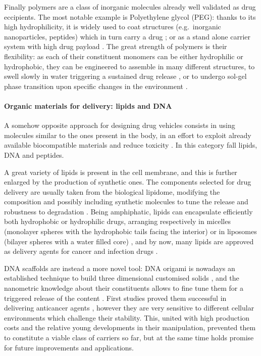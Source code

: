 Finally polymers are a class of inorganic molecules already well validated as drug eccipients. The most notable example is Polyethylene glycol (PEG): thanks to its high hydrophilicity, it is widely used to coat structures (e.g.\ inorganic nanoparticles, peptides) which in turn carry a drug \cite{Lammers2009}; or as a stand alone carrier system with high drug payload \cite{Liechty2010}. The great strength of polymers is their flexibility: as each of their constituent monomers can be either hydrophilic or hydrophobic, they can be engineered to assemble in many different structures, to swell slowly in water triggering a sustained drug release \cite{Nicolas2013}, or to undergo sol-gel phase transition upon specific changes in the environment \cite{Liechty2010}.


\paragraph{Organic materials for delivery: lipids and DNA} \label{sec:organic}

A somehow opposite approach for designing drug vehicles consists in using molecules similar to the ones present in the body, in an effort to exploit already available biocompatible materials and reduce toxicity \cite{Yoo2011}. In this category fall lipids, DNA and peptides.

A great variety of lipids is present in the cell membrane, and this is further enlarged by the production of synthetic ones. The components selected for drug delivery are usually taken from the biological lipidome, modifying the composition and possibly including synthetic molecules to tune the release and robustness to degradation \cite{Yingchoncharoen2016}.
%
Being amphiphatic, lipids can encapsulate efficiently both hydrophobic or hydrophilic drugs, arranging respectively in micelles (monolayer spheres with the hydrophobic tails facing the interior) or in liposomes (bilayer spheres with a water filled core) \cite{Bunker2016}, and by now, many lipids are approved as delivery agents for cancer and infection drugs \cite{Pattni2015paper, Jain2017}.

DNA scaffolds are instead a more novel tool: DNA origami is nowadays an established technique to build three dimensional customised solids \cite{Linko2015}, and the nanometric knowledge about their constituents allows to fine tune them for a triggered release of the content \cite{Douglas2012}. First studies proved them successful in delivering anticancer agents \cite{Zhang2014, Jiang2012}, however they are very sensitive to different cellular environments which challenge their stability. This, united with high production costs and the relative young developments in their manipulation, prevented them to constitute a viable class of carriers so far, but at the same time holds promise for future improvements and applications.


